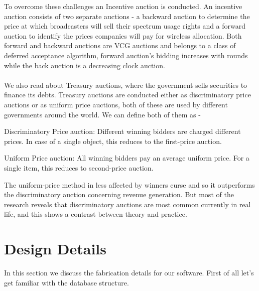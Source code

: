 \documentclass[a4paper]{article}
\begin{document}
To overcome these challenges an Incentive auction is conducted. An incentive auction consists of two separate auctions - a backward auction to determine the price at which broadcasters will sell their spectrum usage rights and a forward auction to identify the prices companies will pay for wireless allocation. Both forward and backward auctions are VCG auctions and belongs to a class of deferred acceptance algorithm, forward auction's bidding increases with rounds while the back auction is a decreasing clock auction.
\\\\
We also read about Treasury auctions, where the government sells securities to finance its debts. Treasury auctions are conducted either as discriminatory price auctions or as uniform price auctions, both of these are used by different governments around the world. We can define both of them as - 

Discriminatory Price auction: Different winning bidders are charged different prices. In case of a single object, this reduces to the first-price auction.

Uniform Price auction: All winning bidders pay an average uniform price. For a single item, this reduces to second-price auction.

The uniform-price method in less affected by winners curse and so it outperforms the discriminatory auction concerning revenue generation. But most of the research reveals that discriminatory auctions are most common currently in real life, and this shows a contrast between theory and practice.


\pagebreak
\section*{Design Details}
In this section we discuss the fabrication details for our software. First of all let's get familiar with the database structure.
\end{document}
